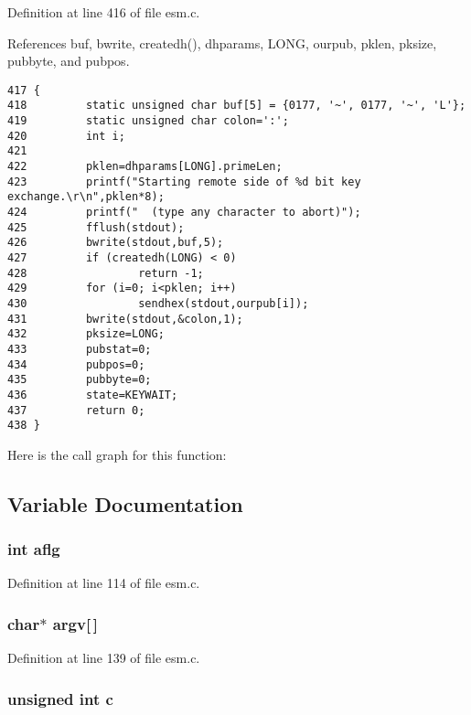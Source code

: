 Definition at line 416 of file esm.c.

References buf, bwrite, createdh(), dhparams, LONG, ourpub, pklen, pksize, pubbyte, and pubpos.



\footnotesize\begin{verbatim}417 {
418         static unsigned char buf[5] = {0177, '~', 0177, '~', 'L'};
419         static unsigned char colon=':';
420         int i;
421 
422         pklen=dhparams[LONG].primeLen;
423         printf("Starting remote side of %d bit key exchange.\r\n",pklen*8);
424         printf("  (type any character to abort)");
425         fflush(stdout);
426         bwrite(stdout,buf,5);
427         if (createdh(LONG) < 0)
428                 return -1;
429         for (i=0; i<pklen; i++)
430                 sendhex(stdout,ourpub[i]);
431         bwrite(stdout,&colon,1);
432         pksize=LONG;
433         pubstat=0;
434         pubpos=0;
435         pubbyte=0;
436         state=KEYWAIT;
437         return 0;
438 }
\end{verbatim}\normalsize 


Here is the call graph for this function:

\subsection{Variable Documentation}
\subsubsection{\setlength{\rightskip}{0pt plus 5cm}int {\bf aflg}}\label{esm_8c_a36}




Definition at line 114 of file esm.c.
\subsubsection{\setlength{\rightskip}{0pt plus 5cm}char$\ast$ {\bf argv}[$\,$]}\label{esm_8c_a42}




Definition at line 139 of file esm.c.
\subsubsection{\setlength{\rightskip}{0pt plus 5cm}unsigned int {\bf c}}\label{esm_8c_a47}




